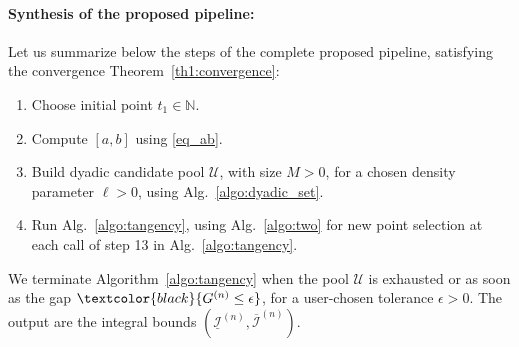 \documentclass[review]{elsarticle}
\newcommand{\cblue}{\textcolor{black}}
\begin{document}
\paragraph{Synthesis of the proposed pipeline:} Let us summarize below the steps of the complete proposed pipeline, satisfying the convergence Theorem~\ref{th1:convergence}:
\begin{enumerate}
    \item Choose initial point $t_1 \in \mathbb{N}$. 
    \item Compute $[a,b]$ using \eqref{eq_ab}.
    \item Build dyadic candidate pool $\mathcal{U}$, with size $M>0$, for a chosen density parameter $\ell>0$, using Alg.~\ref{algo:dyadic_set}.
    \item Run Alg.~\ref{algo:tangency}, using Alg.~\ref{algo:two} for new point selection at each call of step 13 in Alg.~\ref{algo:tangency}.
\end{enumerate}
We terminate Algorithm~\ref{algo:tangency} when the pool $\mathcal{U}$ is exhausted or as soon as the gap $\cblue{G^{(n)} \leq \epsilon}$,
for a user-chosen tolerance $\epsilon>0$. The output are the integral bounds $(\underline{\mathcal{I}}^{(n)},\overline{\mathcal{I}}^{(n)})$.



\end{document}
